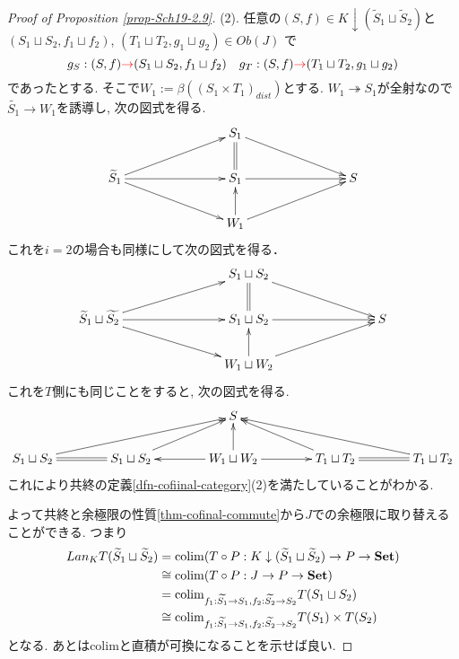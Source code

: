 \documentclass[dvipdfmx,a4paper,11pt]{report}
\newcommand{\colim}{{\rm colim}}
\theoremstyle{definition}
\newcommand{\xr}[1]{\textcolor{red}{#1}}
\begin{document}
\begin{proof}[Proof of Proposition \ref{prop-Sch19-2.9}]
(2). 任意の$(S, f) \in K \downarrow  (\widetilde{S}_1 \sqcup  \widetilde{S}_2)$と
$(S_1 \sqcup  S_2, f_1 \sqcup  f_2)$, $(T_1 \sqcup  T_2, g_1 \sqcup  g_2) \in Ob(J)$ で
$$
g_{S} : (S, f) \xr{\to}(S_1 \sqcup  S_2, f_1 \sqcup  f_2)
\quad
g_{T} : (S, f) \xr{\to}(T_1 \sqcup  T_2, g_1 \sqcup  g_2)
$$
であったとする.
そこで$W_1 := \beta((S_1\times T_1)_{dist})$とする.
$W_1 \twoheadrightarrow S_1$が全射なので$\widetilde{S_1} \to W_1$を誘導し, 次の図式を得る. 
\begin{equation*}
\label{eq-conti}
\xymatrix@C=78pt@R=20pt{
&S_1 \ar@{->}[rd]\ar@{=}[d]
& 
\\
\widetilde{S}_1 
 \ar@{->}[r] \ar@{->}[rd]\ar@{->}[ru]
&S_1  \ar@{->}[r] 
& S
\\
&W_1 \ar@{->}[ru] \ar@{->}[u]
& 
\\
}
\end{equation*}
これを$i=2$の場合も同様にして次の図式を得る．
\begin{equation*}
\label{eq-conti}
\xymatrix@C=78pt@R=20pt{
&S_1\sqcup S_2 \ar@{->}[rd]\ar@{=}[d]
& 
\\
\widetilde{S}_1 \sqcup \widetilde{S_2}
 \ar@{->}[r] \ar@{->}[rd]\ar@{->}[ru]
&S_1 \sqcup S_2  \ar@{->}[r] 
& S
\\
&W_1\sqcup W_2 \ar@{->}[ru] \ar@{->}[u]
& 
\\
}
\end{equation*}
これを$T$側にも同じことをすると, 次の図式を得る. 
\begin{equation*}
\label{eq-conti}
\xymatrix@C=40pt@R=20pt{
&
&
S&
&
\\
S_1 \sqcup S_2\ar@{->}[rru] \ar@{=}[r]&
S_1 \sqcup S_2\ar@{->}[ru]&
W_1 \sqcup W_2\ar@{->}[u] \ar@{->}[r] \ar@{->}[l]&
T_1 \sqcup T_2\ar@{->}[lu]\ar@{=}[r]&
T_1 \sqcup T_2 \ar@{->}[llu]
}
\end{equation*}
これにより共終の定義\ref{dfn-cofiinal-category}(2)を満たしていることがわかる.

よって共終と余極限の性質\ref{thm-cofinal-commute}から$J$での余極限に取り替えることができる. つまり
\begin{align*}
\begin{split}
Lan_{K}T (\widetilde{S}_1 \sqcup  \widetilde{S}_2) 
&=
\colim(T \circ P : K \downarrow  (\widetilde{S}_1 \sqcup  \widetilde{S}_2) \to P \to {\bf Set}) \\
&\cong
\colim(T \circ P : J   \to P \to {\bf Set}) \\
&=
\colim_{f_1: \widetilde{S_1} \to S_1,  f_2: \widetilde{S_2} \to S_2} T(S_1 \sqcup  S_2) \\
& \cong 
\colim_{f_1 : \widetilde{S_1} \to S_1,  f_2: \widetilde{S_2} \to S_2} T(S_1) \times  T( S_2)
\end{split}
\end{align*}
となる.
あとはcolimと直積が可換になることを示せば良い.


\end{proof}
\end{document}

